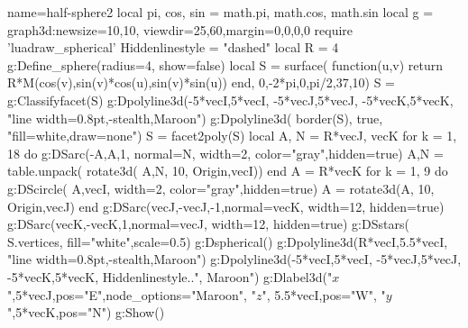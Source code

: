 \documentclass[border=5pt]{standalone}%
\begin{document}
\begin{luadraw}{name=half-sphere2}
local pi, cos, sin = math.pi, math.cos, math.sin
local g = graph3d:new{size={10,10}, viewdir={25,60},margin={0,0,0,0}}
require 'luadraw_spherical'
Hiddenlinestyle = "dashed"
local R = 4
g:Define_sphere({radius=4, show=false})
local S = surface( function(u,v) return R*M(cos(v),sin(v)*cos(u),sin(v)*sin(u)) end, 0,-2*pi,0,pi/2,{37,10})
S = g:Classifyfacet(S)
g:Dpolyline3d({{-5*vecI,5*vecI}, {-5*vecJ,5*vecJ}, {-5*vecK,5*vecK}}, "line width=0.8pt,-stealth,Maroon")
g:Dpolyline3d( border(S), true, "fill=white,draw=none")
S = facet2poly(S)
local A, N = R*vecJ, vecK
for k = 1, 18 do
    g:DSarc({-A,A},1, {normal=N, width=2, color="gray",hidden=true})
    A,N = table.unpack( rotate3d( {A,N}, 10, {Origin,vecI}))
end
A = R*vecK
for k = 1, 9 do
    g:DScircle( {A,vecI}, {width=2, color="gray",hidden=true})
    A = rotate3d(A, 10, {Origin,vecJ})
end
g:DSarc({vecJ,-vecJ},-1,{normal=vecK, width=12, hidden=true})
g:DSarc({vecK,-vecK},1,{normal=vecJ, width=12, hidden=true})
g:DSstars( S.vertices, {fill="white",scale=0.5})
g:Dspherical()
g:Dpolyline3d({R*vecI,5.5*vecI}, "line width=0.8pt,-stealth,Maroon")
g:Dpolyline3d({{-5*vecI,5*vecI}, {-5*vecJ,5*vecJ}, {-5*vecK,5*vecK}}, Hiddenlinestyle..", Maroon")
g:Dlabel3d("$x$",5*vecJ,{pos="E",node_options="Maroon"}, "$z$", 5.5*vecI,{pos="W"}, "$y$",5*vecK,{pos="N"})
g:Show()
\end{luadraw}
\end{document}
